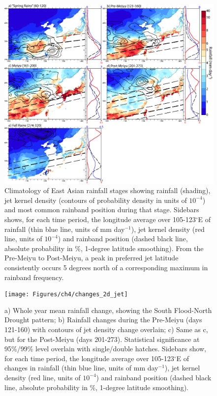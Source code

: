 \begin{figure}
\centering
\noindent\includegraphics[width=36pc]{Figures/ch4/climo}
\caption{Climatology of East Asian rainfall stages showing rainfall (shading), jet kernel density (contours of probability density in units of $10^{-4}$) and most common rainband position during that stage. Sidebars shows, for each time period, the longitude average over 105-123$^{\circ}$E of rainfall (thin blue line, units of mm day$^{-1}$), jet kernel density (red line, units of $10^{-4}$) and rainband position (dashed black line, absolute probability in \%, 1-degree latitude smoothing). From the Pre-Meiyu to Post-Meiyu, a peak in preferred jet latitude consistently occurs 5 degrees north of a corresponding maximum in rainband frequency.}
\label{fig:climo}
\end{figure}


\begin{figure}
\centering
\noindent\texttt{[image: Figures/ch4/changes\_2d\_jet]}
\caption{a) Whole year mean rainfall change, showing the South Flood-North Drought pattern; b) Rainfall changes during the Pre-Meiyu (days 121-160) with contours of jet density change overlain; c) Same as c, but for the Post-Meiyu (days 201-273). Statistical significance at 95\%/99\% level overlain with single/double hatches. Sidebars show, for each time period, the longitude average over 105-123$^{\circ}$E of changes in rainfall (thin blue line, units of mm day$^{-1}$), jet kernel density (red line, units of $10^{-4}$) and rainband position (dashed black line, absolute probability in \%, 1-degree latitude smoothing).}
\label{fig:changes_2d}
\end{figure}

